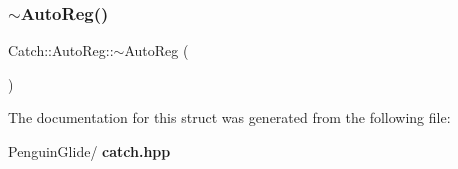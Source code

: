 \mbox{\label{struct_catch_1_1_auto_reg_a3cdb53f1e5ff115310f3372bebe198f1}} 
\subsubsection{$\sim$AutoReg()}
{\footnotesize\ttfamily Catch\+::\+Auto\+Reg\+::$\sim$\+Auto\+Reg (\begin{DoxyParamCaption}{ }\end{DoxyParamCaption})}



The documentation for this struct was generated from the following file\+:\begin{DoxyCompactItemize}
\item 
Penguin\+Glide/\textbf{ catch.\+hpp}\end{DoxyCompactItemize}
